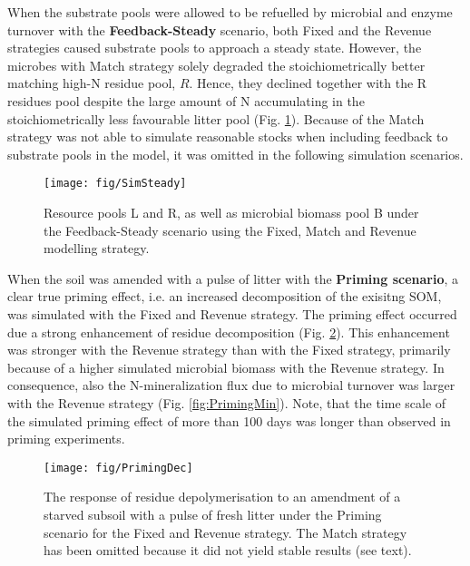 When the substrate pools were allowed to be refuelled by microbial and enzyme
turnover with the \textbf{Feedback-Steady} scenario, both Fixed and the Revenue
strategies caused substrate pools to approach a steady state.
However, the microbes with Match strategy solely degraded the stoichiometrically
better matching high-N residue pool, $R$. Hence, they declined together with the
R residues pool despite the large amount of N accumulating in the
stoichiometrically less favourable litter pool (Fig. \ref{fig:SimSteady}).
Because of the Match strategy was not able to simulate reasonable stocks when
including feedback to substrate pools in the model, it was omitted in the
following simulation scenarios.

\begin{figure}[t]
\vspace*{2mm}
\begin{center} 
\texttt{[image: fig/SimSteady]} 
\end{center}
\caption{Resource pools L and R, as well as microbial biomass pool B under the Feedback-Steady scenario using the Fixed, Match and Revenue modelling strategy.
\label{fig:SimSteady}} 
\end{figure}

When the soil was amended with a pulse of litter with the \textbf{Priming
scenario}, a clear true priming effect, i.e. an increased decomposition of the
exisitng SOM, was simulated with the Fixed and Revenue strategy.
The priming effect occurred due a strong enhancement of residue decomposition
(Fig. \ref{fig:PrimingDec}). This
enhancement was stronger with the Revenue strategy than with the Fixed strategy,
primarily because of a higher simulated microbial biomass with the Revenue
strategy. In consequence, also the N-mineralization flux due to microbial
turnover was larger with the Revenue strategy (Fig. \ref{fig:PrimingMin}).
Note, that the time scale of the simulated priming effect of more than 100 days
was longer than observed in priming experiments.

\begin{figure}[t]
\vspace*{2mm}
\begin{center}
\texttt{[image: fig/PrimingDec]}
\end{center}
\caption{The response of residue depolymerisation to an amendment of a starved subsoil with a pulse of fresh litter under the Priming scenario for the Fixed and Revenue strategy. The Match strategy has been omitted because it did not yield stable results (see text).
\label{fig:PrimingDec}}
\end{figure}

